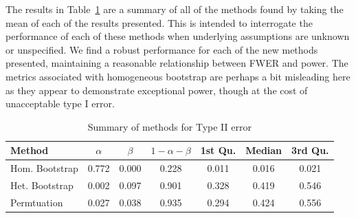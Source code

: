 \documentclass{article}
\begin{document}
The results in Table~\ref{tab:type_2_summary} are a summary of all of the methods found by taking the mean of each of the results presented. This is intended to interrogate the performance of each of these methods when underlying assumptions are unknown or unspecified. We find a robust performance for each of the new methods presented, maintaining a reasonable relationship between FWER and power. The metrics associated with homogeneous bootstrap are perhaps a bit misleading here as they appear to demonstrate exceptional power, though at the cost of unacceptable type I error.

\begin{table}[H]
\centering
\begin{tabular}{lcccccc}
  \hline
Method & $\alpha$ & $\beta$ & $1 - \alpha - \beta$ & 1st Qu. & Median & 3rd Qu. \\ 
  \hline
Hom. Bootstrap & 0.772 & 0.000 & 0.228 & 0.011 & 0.016 & 0.021 \\ 
  Het. Bootstrap & 0.002 & 0.097 & 0.901 & 0.328 & 0.419 & 0.546 \\ 
  Permtuation & 0.027 & 0.038 & 0.935 & 0.294 & 0.424 & 0.556 \\ 
   \hline
\end{tabular}
\caption{Summary of methods for Type II error} 
\label{tab:type_2_summary}
\end{table}

\end{document}
